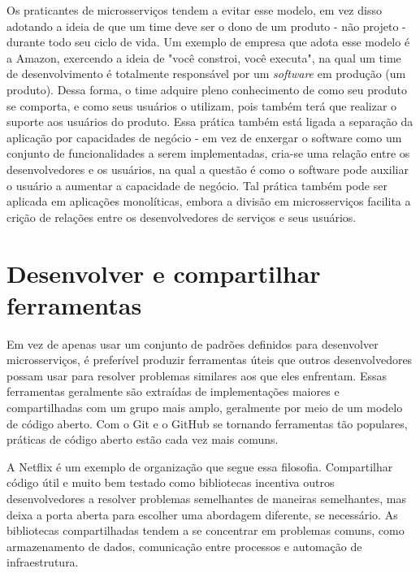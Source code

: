 Os praticantes de microsserviços tendem a evitar esse modelo, em vez disso adotando a ideia de que um time deve ser o dono de um produto - não projeto - durante todo seu ciclo de vida. Um exemplo de empresa que adota esse modelo é a Amazon, exercendo a ideia de "você constroi, você executa", na qual um time de desenvolvimento é totalmente responsável por um \emph{software} em produção (um produto). Dessa forma, o time adquire pleno conhecimento de como seu produto se comporta, e como seus usuários o utilizam, pois também terá que realizar o suporte aos usuários do produto. Essa prática também está ligada a separação da aplicação por capacidades de negócio - em vez de enxergar o software como um conjunto de funcionalidades a serem implementadas, cria-se uma relação entre os desenvolvedores e os usuários, na qual a questão é como o software pode auxiliar o usuário a aumentar a capacidade de negócio. Tal prática também pode ser aplicada em aplicações monolíticas, embora a divisão em microsserviços facilita a crição de relações entre os desenvolvedores de serviços e seus usuários. \cite{MartinFowlerMicroservices}



\section{Desenvolver e compartilhar ferramentas}
Em vez de apenas usar um conjunto de padrões definidos para desenvolver microsserviços, é preferível produzir ferramentas úteis que outros desenvolvedores possam usar para resolver problemas similares aos que eles enfrentam. Essas ferramentas geralmente são extraídas de implementações maiores e compartilhadas com um grupo mais amplo, geralmente por meio de um modelo de código aberto. Com o Git e o GitHub se tornando ferramentas tão populares, práticas de código aberto estão cada vez mais comuns. \cite{MartinFowlerMicroservices}

A Netflix é um exemplo de organização que segue essa filosofia. Compartilhar código útil e muito bem testado como bibliotecas incentiva outros desenvolvedores a resolver problemas semelhantes de maneiras semelhantes, mas deixa a porta aberta para escolher uma abordagem diferente, se necessário. As bibliotecas compartilhadas tendem a se concentrar em problemas comuns, como armazenamento de dados, comunicação entre processos e automação de infraestrutura. \cite{MartinFowlerMicroservices}

